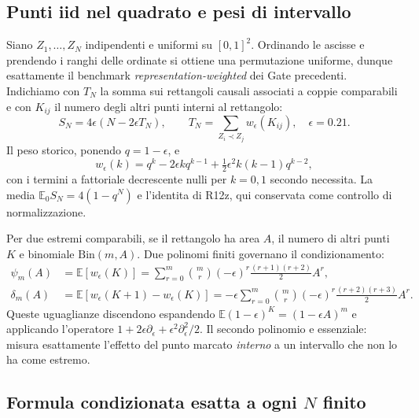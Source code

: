 \documentclass[11pt,a4paper]{article}
\begin{document}
\subsection{Punti iid nel quadrato e pesi di intervallo}

Siano $Z_1,\ldots,Z_N$ indipendenti e uniformi su $[0,1]^2$. Ordinando le ascisse e prendendo i ranghi delle ordinate si ottiene una permutazione uniforme, dunque esattamente il benchmark \emph{representation-weighted} dei Gate precedenti. Indichiamo con $T_N$ la somma sui rettangoli causali associati a coppie comparabili e con $K_{ij}$ il numero degli altri punti interni al rettangolo:
\begin{equation}
 S_N=4\epsilon(N-2\epsilon T_N),\qquad
 T_N=\sum_{Z_i\prec Z_j}w_\epsilon(K_{ij}),\quad \epsilon=0.21.
 \label{eq:r12ae_action}
\end{equation}
Il peso storico, ponendo $q=1-\epsilon$, e
\begin{equation}
 w_\epsilon(k)=q^k-2\epsilon kq^{k-1}
       +\tfrac12\epsilon^2k(k-1)q^{k-2},
 \label{eq:r12ae_weight}
\end{equation}
con i termini a fattoriale decrescente nulli per $k=0,1$ secondo necessita. La media $\mathbb E_0S_N=4(1-q^N)$ e l'identita di R12z, qui conservata come controllo di normalizzazione.

Per due estremi comparabili, se il rettangolo ha area $A$, il numero di altri punti $K$ e binomiale $\mathrm{Bin}(m,A)$. Due polinomi finiti governano il condizionamento:
\begin{align}
 \psi_m(A)&=\mathbb E[w_\epsilon(K)]
 =\sum_{r=0}^{m}\binom mr(-\epsilon)^r\frac{(r+1)(r+2)}2 A^r,\\
 \delta_m(A)&=\mathbb E[w_\epsilon(K+1)-w_\epsilon(K)]
 =-\epsilon\sum_{r=0}^{m}\binom mr(-\epsilon)^r
   \frac{(r+2)(r+3)}2 A^r.
 \label{eq:r12ae_psidelta}
\end{align}
Queste uguaglianze discendono espandendo $\mathbb E(1-\epsilon)^K=(1-\epsilon A)^m$ e applicando l'operatore $1+2\epsilon\partial_\epsilon+\epsilon^2\partial_\epsilon^2/2$. Il secondo polinomio e essenziale: misura esattamente l'effetto del punto marcato \emph{interno} a un intervallo che non lo ha come estremo.

\subsection{Formula condizionata esatta a ogni $N$ finito}
\end{document}
